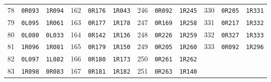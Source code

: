\begin{longtable}{rll@{\qquad}rll@{\qquad}rll@{\qquad}rll}
78 & \texttt{0R093} & \texttt{1R094} & 162 & \texttt{0R176} & \texttt{1R043} & 246 & \texttt{0R092} & \texttt{1R245} & 330 & \texttt{0R205} & \texttt{1R331} \\
79 & \texttt{0L095} & \texttt{1R061} & 163 & \texttt{0R177} & \texttt{1R178} & 247 & \texttt{0R169} & \texttt{1R258} & 331 & \texttt{0R217} & \texttt{1R332} \\
80 & \texttt{0L080} & \texttt{0L033} & 164 & \texttt{0R142} & \texttt{1R136} & 248 & \texttt{0R226} & \texttt{1R259} & 332 & \texttt{0R327} & \texttt{1R333} \\
81 & \texttt{1R096} & \texttt{1R081} & 165 & \texttt{0R179} & \texttt{1R150} & 249 & \texttt{0R205} & \texttt{1R260} & 333 & \texttt{0R092} & \texttt{1R296} \\
82 & \texttt{0L097} & \texttt{1L082} & 166 & \texttt{0R180} & \texttt{1R173} & 250 & \texttt{0R261} & \texttt{1R262} &  &  &  \\
83 & \texttt{1R098} & \texttt{0R083} & 167 & \texttt{0R181} & \texttt{1R182} & 251 & \texttt{0R263} & \texttt{1R140} &  &  &  \\
\bottomrule
\end{longtable}
\endgroup
